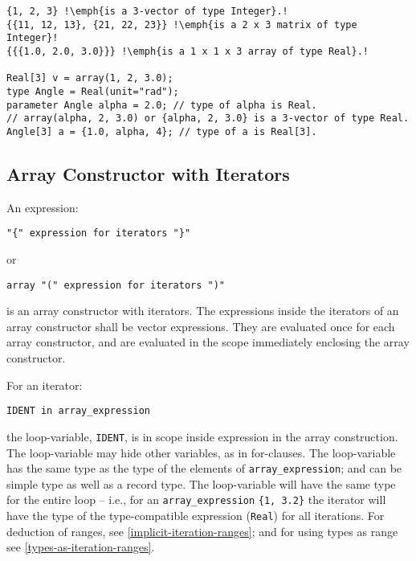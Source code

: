 \begin{example}
\begin{lstlisting}[language=modelica, escapechar=!]
{1, 2, 3} !\emph{is a 3-vector of type Integer}.!
{{11, 12, 13}, {21, 22, 23}} !\emph{is a 2 x 3 matrix of type Integer}!
{{{1.0, 2.0, 3.0}}} !\emph{is a 1 x 1 x 3 array of type Real}.!

Real[3] v = array(1, 2, 3.0);
type Angle = Real(unit="rad");
parameter Angle alpha = 2.0; // type of alpha is Real.
// array(alpha, 2, 3.0) or {alpha, 2, 3.0} is a 3-vector of type Real.
Angle[3] a = {1.0, alpha, 4}; // type of a is Real[3].
\end{lstlisting}
\end{example}

\subsection{Array Constructor with Iterators}\label{array-constructor-with-iterators}

An expression:
\begin{lstlisting}[language=grammar]
"{" expression for iterators "}"
\end{lstlisting}
or
\begin{lstlisting}[language=grammar]
array "(" expression for iterators ")"
\end{lstlisting}

is an array constructor with iterators. The expressions inside the
iterators of an array constructor shall be vector expressions. They are
evaluated once for each array constructor, and are evaluated in the
scope immediately enclosing the array constructor.

For an iterator:
\begin{lstlisting}[language=modelica]
IDENT in array_expression
\end{lstlisting}
the loop-variable, \lstinline!IDENT!, is in scope inside expression in the array construction.  The loop-variable may hide other variables, as in for-clauses.  The loop-variable has the same type as
the type of the elements of \lstinline!array_expression!; and can be simple type as well as a record type.  The loop-variable will have the same type for the entire loop -- i.e., for an
\lstinline!array_expression! \lstinline!{1, 3.2}! the iterator will have the type of the type-compatible expression (\lstinline!Real!) for all iterations.  For deduction of ranges, see
\cref{implicit-iteration-ranges}; and for using types as range see \cref{types-as-iteration-ranges}.

